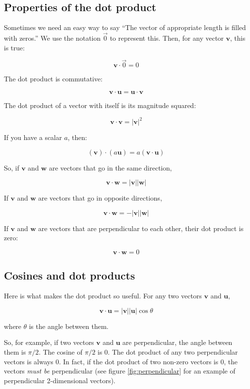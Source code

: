 \subsection{Properties of the dot product}

Sometimes we need an easy way to say ``The vector of appropriate length is 
filled with zeros.'' We use the notation $\vec{0}$ to represent this. Then, 
for any vector $\textbf{v}$, this is true:

$$\textbf{v} \cdot \vec{0} = 0$$

The dot product is commutative:

$$\textbf{v} \cdot \textbf{u} = \textbf{u} \cdot \textbf{v}$$

The dot product of a vector with itself is its magnitude squared:

$$ \textbf{v} \cdot \textbf{v} = |\textbf{v}|^2 $$

If you have a scalar $a$, then:

    $$(\textbf{v}) \cdot (a \textbf{u}) = a (\textbf{v} \cdot \textbf{u})$$

So, if $\textbf{v}$ and $\textbf{w}$ are vectors that go in the same direction,

    $$\textbf{v} \cdot \textbf{w} = |\textbf{v}| |\textbf{w}|$$

If $\textbf{v}$ and $\textbf{w}$ are vectors that go in opposite directions,

    $$\textbf{v} \cdot \textbf{w} = -|\textbf{v}| |\textbf{w}|$$
    
If $\textbf{v}$ and $\textbf{w}$ are vectors that are perpendicular to each
other, their dot product is zero:

  $$ \textbf{v} \cdot \textbf{w} = 0 $$

\subsection{Cosines and dot products}

Here is what makes the dot product so useful. For any two vectors
$\textbf{v}$ and $\textbf{u}$,

$$\textbf{v} \cdot \textbf{u} = |\textbf{v}| |\textbf{u}| \cos \theta$$

where $\theta$ is the angle between them.

So, for example, if two vectors $\textbf{v}$ and $\textbf{u}$ are 
perpendicular, the angle between them is $\pi/2$. The cosine of $\pi/2$ is 0. 
The dot product of any two perpendicular vectors is always 0. In fact, if the 
dot product of two non-zero vectors is 0, the vectors \textit{must be} 
perpendicular (see figure \ref{fig:perpendicular} for an example of 
perpendicular 2-dimensional vectors). 


